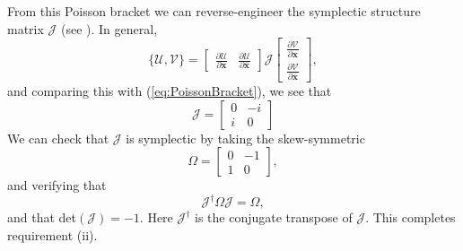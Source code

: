 From this Poisson bracket we can reverse-engineer the symplectic structure matrix $\mathcal{J}$ (see \cite[p.~65]{marsden}).  In general, 
\begin{equation}
\label{eq: comppois}
    \{\mathcal{U},\mathcal{V}\} = \begin{bmatrix}
    \frac{\partial \mathcal{U}}{\partial \textbf{x}}&\frac{\partial \mathcal{U}}{\partial \bar{\textbf{x}}}
    \end{bmatrix} 
\mathcal{J}
    \begin{bmatrix}
    \frac{\partial \mathcal{V}}{\partial \textbf{x}}\\
    \frac{\partial \mathcal{V}}{\partial \bar{\textbf{x}}}
    \end{bmatrix},
\end{equation}
and comparing this with (\ref{eq:PoissonBracket}), we see that
\begin{equation}
\label{eq: structure}
    \mathcal{J}= \begin{bmatrix}
    0&-i\\i&0
    \end{bmatrix}
\end{equation}
We can check that $\mathcal{J}$ is symplectic by taking the skew-symmetric
\begin{equation*}
    \Omega = \begin{bmatrix}
    0&-1\\1&0
    \end{bmatrix},
\end{equation*}
and verifying that  
\begin{equation}
    \mathcal{J}^\dagger\Omega\mathcal{J}=\Omega,
\end{equation}
and that det$(\mathcal{J})=-1$. %
Here $\mathcal{J}^\dagger$ is the conjugate transpose of $\mathcal{J}$.  This completes requirement (ii).







